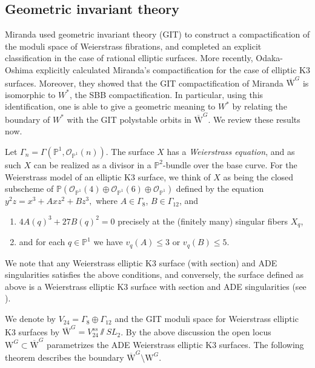 \documentclass[11pt]{amsart}
\theoremstyle{definition}
\theoremstyle{remark}
\newcommand{\bP}{{\mathbb P}}
\newcommand{\calO}{\mathcal O}
\newcommand{\oMG}{\overline{\mathrm{W}}^G}
\newcommand{\MG}{{\mathrm{W}}^G}
\begin{document}
	
	\subsection{Geometric invariant theory}\label{sec:gitbackground}
	Miranda \cite{mir} used geometric invariant theory (GIT) to construct a compactification of the moduli space of Weierstrass fibrations, and completed an explicit classification in the case of rational elliptic surfaces. More recently, Odaka-Oshima \cite{oo} explicitly calculated Miranda's compactification for the case of elliptic K3 surfaces. Moreover, they showed that the GIT compactification of Miranda $\oMG$ is isomorphic to $W^*$, the SBB compactification. In particular, using this identification, one is able to give a geometric meaning to $W^*$ by relating the boundary of $W^*$ with the GIT polystable orbits in $\oMG$. We review these results now.
	
	
	
	Let $\Gamma_n = \Gamma(\bP^1, \calO_{\bP^1}(n))$. The surface $X$ has a \emph{Weierstrass equation}, and as such $X$ can be realized as a divisor in a $\bP^2$-bundle over the base curve. For the Weierstrass model of an elliptic K3 surface, we think of $X$ as being the closed subscheme of $\bP(\calO_{\bP^1}(4) \oplus \calO_{\bP^1}(6) \oplus \calO_{\bP^1})$ defined by the equation $y^2z = x^3 + Axz^2 + Bz^3,$ where $A \in \Gamma_8$, $B \in \Gamma_{12}$,  and 
	\begin{enumerate}
		\item $4A(q)^3 + 27B(q)^2 = 0$ precisely at the (finitely many) singular fibers $X_q$, 
		\item and for each $q \in \bP^1$ we have $v_q(A) \leq 3$ or $v_q(B) \leq 5$. 
	\end{enumerate} 
	
	We note that any Weierstrass elliptic K3 surface (with section) and ADE singularities satisfies the above conditions, and conversely, the surface defined as above is a Weierstrass elliptic K3 surface with section and ADE singularities (see \cite[Theorem 7.1]{oo}). 
	
	We denote by $V_{24} = \Gamma_8 \oplus \Gamma_{12}$ and the GIT moduli space for Weierstrass elliptic K3 surfaces by $\oMG = V_{24}^{ss} \sslash SL_2$. By the above discussion the open locus $\MG \subset \oMG$ parametrizes the ADE Weierstrass elliptic K3 surfaces. The following theorem describes the boundary $\oMG \setminus \MG$. 
	
\end{document}
